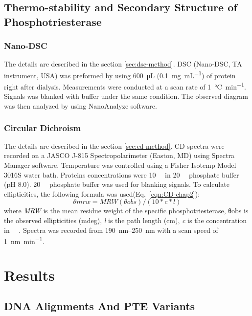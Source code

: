 \begin{refsection}
\subsection{Thermo-stability and Secondary Structure of Phosphotriesterase}

\subsubsection{Nano-DSC}

The details are described in the section \ref{sec:dsc-method}. DSC (Nano-DSC,
TA instrument, USA) was preformed by using \SI{600}{\micro\L}
(\SI{0.1}{\mg\per\mL}) of protein right after dialysis. Measurements were
conducted at a scan rate of \SI{1}{\celsius\per\minute}. Signals was blanked with
buffer under the same condition.  The observed diagram was then analyzed by
using NanoAnalyze software.

\subsubsection{Circular Dichroism}

The details are described in the section \ref{sec:cd-method}. CD spectra were
recorded on a JASCO J-815 Spectropolarimeter (Easton, MD) using Spectra Manager
software. Temperature was controlled using a Fisher Isotemp Model 3016S water
bath. Proteins concentrations were \SI{10}{\micro\Molar} in
\SI{20}{\milli\Molar} phosphate buffer (pH 8.0). \SI{20}{\milli\Molar}
phosphate buffer was used for blanking signals. To calculate ellipticities, the
following formula was used(Eq.~\ref{eqn:CD-chap2}): 
\begin{equation}
    θmrw = MRW(θobs) / (10 * c * l)
    \label{eqn:CD-chap2}
\end{equation}
where \emph{MRW} is the mean residue weight of the specific phosphotriesterase,
θobs is the observed ellipticities (mdeg), \emph{l} is the path length (cm),
\emph{c} is the concentration in \SI{}{\micro\Molar}. Spectra was recorded from
\SIrange{190}{250}{\nm} with a scan speed of \SI{1}{\nano\meter\per\minute}.

\section{Results}

\subsection{DNA Alignments And PTE Variants}


\end{refsection}
